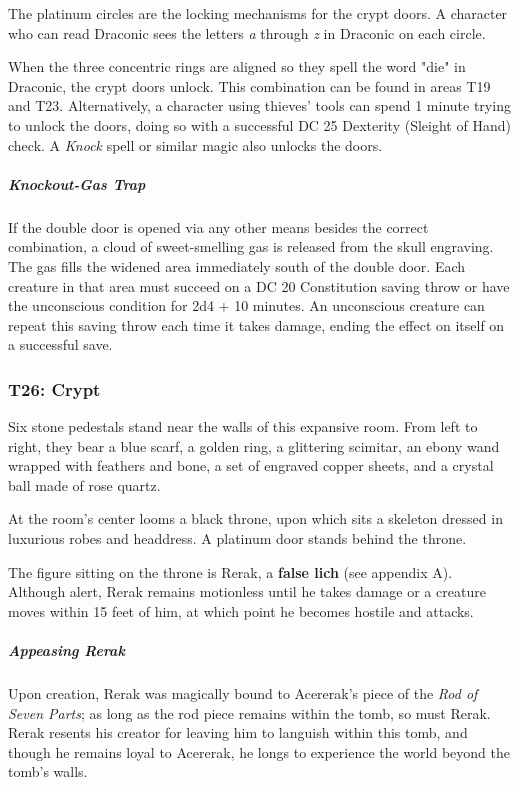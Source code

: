 \documentclass[10pt,a4paper,twoside,bg=print,twocolumn,openany,nodeprecatedcode]{dndbook}
\begin{document}
The platinum circles are the locking mechanisms for the crypt doors. A character who can read Draconic sees the letters \textit{a} through \textit{z} in Draconic on each circle.

When the three concentric rings are aligned so they spell the word "die" in Draconic, the crypt doors unlock. This combination can be found in areas T19 and T23. Alternatively, a character using thieves' tools can spend 1 minute trying to unlock the doors, doing so with a successful DC 25 Dexterity (Sleight of Hand) check. A \textit{Knock} spell or similar magic also unlocks the doors.

\subparagraph{Knockout-Gas Trap}
If the double door is opened via any other means besides the correct combination, a cloud of sweet-smelling gas is released from the skull engraving. The gas fills the widened area immediately south of the double door. Each creature in that area must succeed on a DC 20 Constitution saving throw or have the unconscious condition for 2d4 + 10 minutes. An unconscious creature can repeat this saving throw each time it takes damage, ending the effect on itself on a successful save.

\subsubsection{T26: Crypt}
\begin{DndReadAloud}{}
Six stone pedestals stand near the walls of this expansive room. From left to right, they bear a blue scarf, a golden ring, a glittering scimitar, an ebony wand wrapped with feathers and bone, a set of engraved copper sheets, and a crystal ball made of rose quartz.

At the room's center looms a black throne, upon which sits a skeleton dressed in luxurious robes and headdress. A platinum door stands behind the throne.

\end{DndReadAloud}

The figure sitting on the throne is Rerak, a \textbf{false lich} (see appendix A). Although alert, Rerak remains motionless until he takes damage or a creature moves within 15 feet of him, at which point he becomes hostile and attacks.

\subparagraph{Appeasing Rerak}
Upon creation, Rerak was magically bound to Acererak's piece of the \textit{Rod of Seven Parts}; as long as the rod piece remains within the tomb, so must Rerak. Rerak resents his creator for leaving him to languish within this tomb, and though he remains loyal to Acererak, he longs to experience the world beyond the tomb's walls.
\end{document}
